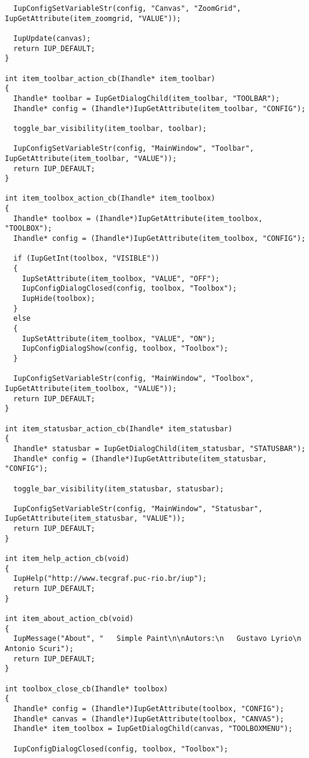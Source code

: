 \documentclass{ctexart}
\begin{document}
\begin{lstlisting}
  IupConfigSetVariableStr(config, "Canvas", "ZoomGrid", IupGetAttribute(item_zoomgrid, "VALUE"));

  IupUpdate(canvas);
  return IUP_DEFAULT;
}

int item_toolbar_action_cb(Ihandle* item_toolbar)
{
  Ihandle* toolbar = IupGetDialogChild(item_toolbar, "TOOLBAR");
  Ihandle* config = (Ihandle*)IupGetAttribute(item_toolbar, "CONFIG");

  toggle_bar_visibility(item_toolbar, toolbar);

  IupConfigSetVariableStr(config, "MainWindow", "Toolbar", IupGetAttribute(item_toolbar, "VALUE"));
  return IUP_DEFAULT;
}

int item_toolbox_action_cb(Ihandle* item_toolbox)
{
  Ihandle* toolbox = (Ihandle*)IupGetAttribute(item_toolbox, "TOOLBOX");
  Ihandle* config = (Ihandle*)IupGetAttribute(item_toolbox, "CONFIG");

  if (IupGetInt(toolbox, "VISIBLE"))
  {
    IupSetAttribute(item_toolbox, "VALUE", "OFF");
    IupConfigDialogClosed(config, toolbox, "Toolbox");
    IupHide(toolbox);
  }
  else
  {
    IupSetAttribute(item_toolbox, "VALUE", "ON");
    IupConfigDialogShow(config, toolbox, "Toolbox");
  }

  IupConfigSetVariableStr(config, "MainWindow", "Toolbox", IupGetAttribute(item_toolbox, "VALUE"));
  return IUP_DEFAULT;
}

int item_statusbar_action_cb(Ihandle* item_statusbar)
{
  Ihandle* statusbar = IupGetDialogChild(item_statusbar, "STATUSBAR");
  Ihandle* config = (Ihandle*)IupGetAttribute(item_statusbar, "CONFIG");

  toggle_bar_visibility(item_statusbar, statusbar);

  IupConfigSetVariableStr(config, "MainWindow", "Statusbar", IupGetAttribute(item_statusbar, "VALUE"));
  return IUP_DEFAULT;
}

int item_help_action_cb(void)
{
  IupHelp("http://www.tecgraf.puc-rio.br/iup");
  return IUP_DEFAULT;
}

int item_about_action_cb(void)
{
  IupMessage("About", "   Simple Paint\n\nAutors:\n   Gustavo Lyrio\n   Antonio Scuri");
  return IUP_DEFAULT;
}

int toolbox_close_cb(Ihandle* toolbox)
{
  Ihandle* config = (Ihandle*)IupGetAttribute(toolbox, "CONFIG");
  Ihandle* canvas = (Ihandle*)IupGetAttribute(toolbox, "CANVAS");
  Ihandle* item_toolbox = IupGetDialogChild(canvas, "TOOLBOXMENU");

  IupConfigDialogClosed(config, toolbox, "Toolbox");


\end{lstlisting}
\end{document}
